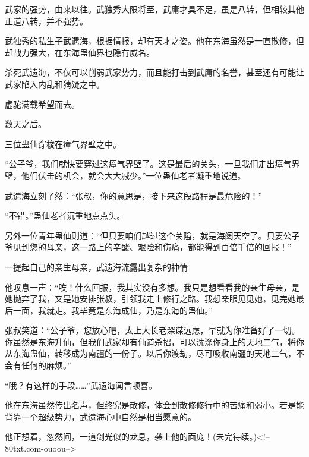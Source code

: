 \begin{this_body}
武家的强势，由来以往。武独秀大限将至，武庸才具不足，虽是八转，但相较其他正道八转，并不强势。

武独秀的私生子武遗海，根据情报，却有天才之姿。他在东海虽然是一直散修，但却战力强大，在东海蛊仙界也隐有威名。

杀死武遗海，不仅可以削弱武家势力，而且能打击到武庸的名誉，甚至还有可能让武家陷入内乱和猜疑之中。

虚驼满载希望而去。

数天之后。

三位蛊仙穿梭在瘴气界壁之中。

“公子爷，我们就快要穿过这瘴气界壁了。这是最后的关头，一旦我们走出瘴气界壁，他们伏击的机会，就会大大减少。”一位蛊仙老者凝重地说道。

武遗海立刻了然：“张叔，你的意思是，接下来这段路程是最危险的！”

“不错。”蛊仙老者沉重地点点头。

另外一位青年蛊仙则道：“但只要咱们越过这个关隘，就是海阔天空了。只要公子爷见到您的母亲，这一路上的辛酸、艰险和伤痛，都能得到百倍千倍的回报！”

一提起自己的亲生母亲，武遗海流露出复杂的神情

他叹息一声：“唉！什么回报，我其实没有多想。我只是想看看我的亲生母亲，是她抛弃了我，又是她安排张叔，引领我走上修行之路。我想亲眼见见她，见完她最后一面，我就走。我毕竟是东海成仙，乃是东海的蛊仙。”

张叔笑道：“公子爷，您放心吧，太上大长老深谋远虑，早就为你准备好了一切。你虽然是东海升仙，但我们武家却有仙道杀招，可以洗涤你身上的天地二气，将你从东海蛊仙，转移成为南疆的一份子。以后你渡劫，尽可吸收南疆的天地二气，不会有任何的麻烦。”

“哦？有这样的手段……”武遗海闻言顿喜。

他在东海虽然传出名声，但终究是散修，体会到散修修行中的苦痛和弱小。若是能背靠一个超级势力，武遗海心中自然是相当愿意的。

他正想着，忽然间，一道剑光似的龙息，袭上他的面庞！(未完待续。)<!--80txt.com-ouoou-->

\end{this_body}

